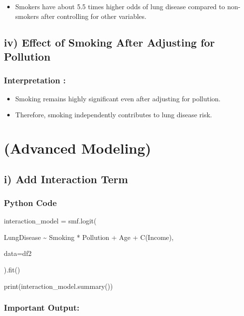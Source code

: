 \documentclass[
]{article}
\begin{document}
\begin{itemize}
\item
  Smokers have about 5.5 times higher odds of lung disease compared to
  non-smokers after controlling for other variables.
\end{itemize}

\subsection{\texorpdfstring{\textbf{iv) Effect of Smoking After
Adjusting for
Pollution}}{iv) Effect of Smoking After Adjusting for Pollution}}\label{iv-effect-of-smoking-after-adjusting-for-pollution}

\subsubsection{Interpretation :}\label{interpretation-4}

\begin{itemize}
\item
  Smoking remains highly significant even after adjusting for pollution.
\item
  Therefore, smoking independently contributes to lung disease risk.
\end{itemize}

\section{\texorpdfstring{\textbf{(Advanced
Modeling)}}{(Advanced Modeling)}}\label{advanced-modeling}

\subsection{i) Add Interaction Term}\label{i-add-interaction-term}

\subsubsection{Python Code}\label{python-code-3}

interaction\_model = smf.logit(

\textquotesingle LungDisease \textasciitilde{} Smoking * Pollution + Age
+ C(Income)\textquotesingle,

data=df2

).fit()

print(interaction\_model.summary())

\subsubsection{Important Output:}\label{important-output}
\end{document}
